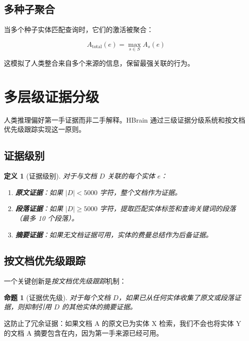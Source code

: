 \documentclass[11pt]{article}
\newtheorem{definition}{定义}
\newtheorem{proposition}{命题}
\begin{document}
\subsection{多种子聚合}

当多个种子实体匹配查询时，它们的激活被聚合：

\begin{equation}
A_{\text{total}}(e) = \max_{s \in S} A_s(e)
\label{eq:aggregation}
\end{equation}

这模拟了人类整合来自多个来源的信息，保留最强关联的行为。

\section{多层级证据分级}
\label{sec:evidence}

人类推理偏好第一手证据而非二手解释。HBrain 通过三级证据分级系统和按文档优先级跟踪实现这一原则。

\subsection{证据级别}

\begin{definition}[证据级别]
对于与文档 $D$ 关联的每个实体 $e$：
\begin{enumerate}
    \item \textbf{原文证据}：如果 $|D| < 5000$ 字符，整个文档作为证据。
    \item \textbf{段落证据}：如果 $|D| \geq 5000$ 字符，提取匹配实体标签和查询关键词的段落（最多 10 个段落）。
    \item \textbf{摘要证据}：如果无文档证据可用，实体的费曼总结作为后备证据。
\end{enumerate}
\end{definition}

\subsection{按文档优先级跟踪}

一个关键创新是\textit{按文档优先级跟踪}机制：

\begin{proposition}[证据优先级]
对于每个文档 $D$，如果已从任何实体收集了原文或段落证据，则抑制引用 $D$ 的其他实体的摘要证据。
\end{proposition}

这防止了冗余证据：如果文档 A 的原文已为实体 X 检索，我们不会也将实体 Y 的文档 A 摘要包含在内，因为第一手来源已经可用。
\end{document}
